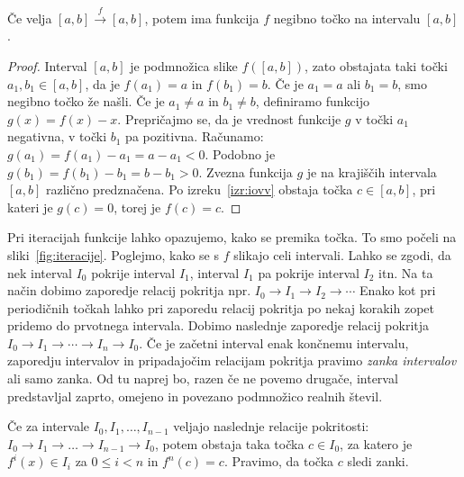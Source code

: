 \documentclass[mat2]{fmfdelo}
\begin{document}
\begin{lema}\label{lem:1zanka}
Če velja $[a, b] \xrightarrow{f} [a, b]$, potem ima funkcija $f$ negibno točko na intervalu $[a, b]$.
\end{lema}
\begin{proof}
Interval $[a, b]$ je podmnožica slike $f([a, b])$, zato obstajata taki točki $a_1, b_1 \in [a, b]$, da je $f(a_1)=a$ in $f(b_1)=b$. Če je $a_1 = a$ ali $b_1 = b$, smo negibno točko že našli. Če je $a_1 \neq a$ in $b_1 \neq b$, definiramo funkcijo $g(x) = f(x) - x$. Prepričajmo se, da je vrednost funkcije $g$ v točki $a_1$ negativna, v točki $b_1$ pa pozitivna. Računamo:
$g(a_1) = f(a_1) - a_1 = a - a_1 < 0$. Podobno je
$g(b_1) = f(b_1) - b_1 = b - b_1 > 0$.
Zvezna funkcija $g$ je na krajiščih intervala $[a, b]$ različno predznačena. Po izreku~\ref{izr:iovv} obstaja točka $c \in [a, b]$, pri kateri je $g(c)=0$, torej je $f(c) = c$.
\end{proof}
Pri iteracijah funkcije lahko opazujemo, kako se premika točka. To smo počeli na sliki~\ref{fig:iteracije}. Poglejmo, kako se s $f$ slikajo celi intervali. Lahko se zgodi, da nek interval $I_0$ pokrije interval $I_1$, interval $I_1$ pa pokrije interval $I_2$ itn. Na ta način dobimo zaporedje relacij pokritja npr. $I_0 \to I_1 \to I_2 \to \cdots $ Enako kot pri periodičnih točkah lahko pri zaporedu relacij pokritja po nekaj korakih zopet pridemo do prvotnega intervala. Dobimo naslednje zaporedje relacij pokritja $I_0 \to I_1 \to \cdots \to I_n \to I_0$. Če je začetni interval enak končnemu intervalu, zaporedju intervalov in pripadajočim relacijam pokritja pravimo \emph{zanka intervalov} ali samo zanka. Od tu naprej bo, razen če ne povemo drugače, interval predstavljal zaprto, omejeno in povezano podmnožico realnih števil.

\begin{lema}\label{lem:zanka}
Če za intervale $I_0, I_1, \dots, I_{n-1}$ veljajo naslednje relacije pokritosti: $I_0 \to I_1 \to \dots \to I_{n-1} \to I_0$, potem obstaja taka točka $c \in I_0$, za katero je $f^{i}(x) \in I_i$ za $0 \leq i < n$ in $f^n(c)=c$. Pravimo, da točka $c$ sledi zanki.
\end{lema}
\end{document}
